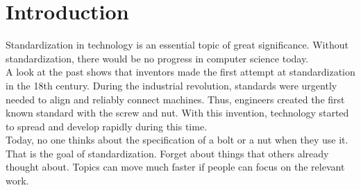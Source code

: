 \section{Introduction}
Standardization in technology is an essential topic of great significance. Without standardization, there would be no progress in computer science today. \\
A look at the past shows that inventors made the first attempt at standardization in the 18th century. During the industrial revolution, standards were urgently needed to align and reliably connect machines. Thus, engineers created the first known standard with the screw and nut. With this invention, technology started to spread and develop rapidly during this time.  \cite{wiki_standardization_2022} \\
Today, no one thinks about the specification of a bolt or a nut when they use it. That is the goal of standardization. Forget about things that others already thought about. Topics can move much faster if people can  focus on the relevant work. \\



%